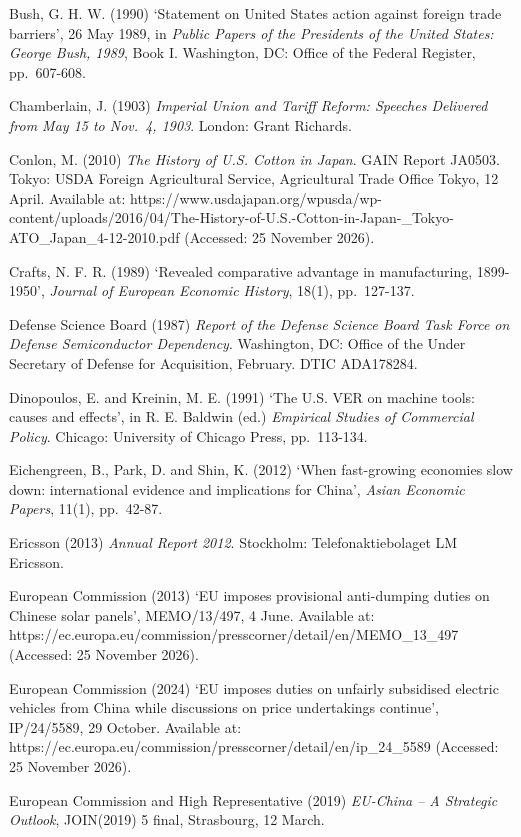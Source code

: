 Bush, G. H. W. (1990) `Statement on United States action against foreign
trade barriers', 26 May 1989, in \emph{Public Papers of the Presidents
of the United States: George Bush, 1989}, Book I. Washington, DC: Office
of the Federal Register, pp.~607-608.

Chamberlain, J. (1903) \emph{Imperial Union and Tariff Reform: Speeches
Delivered from May 15 to Nov.~4, 1903}. London: Grant Richards.

Conlon, M. (2010) \emph{The History of U.S. Cotton in Japan}. GAIN
Report JA0503. Tokyo: USDA Foreign Agricultural Service, Agricultural
Trade Office Tokyo, 12 April. Available at:
https://www.usdajapan.org/wpusda/wp-content/uploads/2016/04/The-History-of-U.S.-Cotton-in-Japan-\_Tokyo-ATO\_Japan\_4-12-2010.pdf
(Accessed: 25 November 2026).

Crafts, N. F. R. (1989) `Revealed comparative advantage in
manufacturing, 1899-1950', \emph{Journal of European Economic History},
18(1), pp.~127-137.

Defense Science Board (1987) \emph{Report of the Defense Science Board
Task Force on Defense Semiconductor Dependency}. Washington, DC: Office
of the Under Secretary of Defense for Acquisition, February. DTIC
ADA178284.

Dinopoulos, E. and Kreinin, M. E. (1991) `The U.S. VER on machine tools:
causes and effects', in R. E. Baldwin (ed.) \emph{Empirical Studies of
Commercial Policy}. Chicago: University of Chicago Press, pp.~113-134.

Eichengreen, B., Park, D. and Shin, K. (2012) `When fast-growing
economies slow down: international evidence and implications for China',
\emph{Asian Economic Papers}, 11(1), pp.~42-87.

Ericsson (2013) \emph{Annual Report 2012}. Stockholm:
Telefonaktiebolaget LM Ericsson.

European Commission (2013) `EU imposes provisional anti-dumping duties
on Chinese solar panels', MEMO/13/497, 4 June. Available at:
https://ec.europa.eu/commission/presscorner/detail/en/MEMO\_13\_497
(Accessed: 25 November 2026).

European Commission (2024) `EU imposes duties on unfairly subsidised
electric vehicles from China while discussions on price undertakings
continue', IP/24/5589, 29 October. Available at:
https://ec.europa.eu/commission/presscorner/detail/en/ip\_24\_5589
(Accessed: 25 November 2026).

European Commission and High Representative (2019) \emph{EU-China -- A
Strategic Outlook}, JOIN(2019) 5 final, Strasbourg, 12 March.

